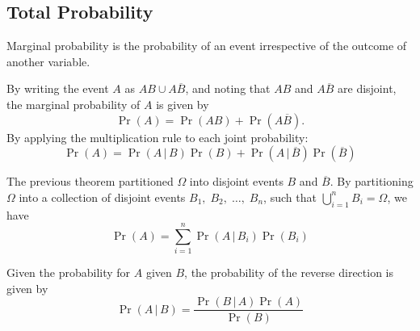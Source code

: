 \documentclass{article}
\begin{document}
\subsection{Total Probability}
\begin{definition}
    Marginal probability is the probability of an event \linebreak irrespective of the outcome of another variable.
\end{definition}
\begin{theorem}
    By writing the event \(A\) as \(AB \cup A\overline{B}\), and noting that \(AB\) and \(A\overline{B}\) are disjoint,
    the marginal probability of \(A\) is given by
    \begin{equation*}
        \Pr{\left( A \right)} = \Pr{\left( AB \right)} + \Pr{\left( A\overline{B} \right)}.
    \end{equation*}
    By applying the multiplication rule to each joint probability:
    \begin{equation*}
        \Pr{\left( A \right)} = \Pr{\left( A \,\vert\, B \right)}\Pr{\left( B \right)} + \Pr{\left( A \,\vert\, \overline{B} \right)}\Pr{\left( \overline{B} \right)}
    \end{equation*}
\end{theorem}
\begin{theorem}
    The previous theorem partitioned \(\Omega\) into disjoint events \(B\) and \(\overline{B}\).
    By partitioning \(\Omega\) into a collection of disjoint events
    \(B_1,\; B_2,\; \dots,\; B_n\), such that \(\bigcup_{i=1}^n B_i =
    \Omega\), we have
    \begin{equation*}
        \Pr{\left( A \right)} = \sum_{i = 1}^n \Pr{\left( A \,\vert\, B_i \right)}\Pr{\left( B_i \right)}
    \end{equation*}
\end{theorem}
\begin{theorem}
    Given the probability for \(A\) given \(B\), the probability of the reverse direction is given by
    \begin{equation*}
        \Pr{\left( A \,\vert\, B \right)} = \frac{\Pr{\left( B \,\vert\, A \right)}\Pr{\left( A \right)}}{\Pr{\left( B \right)}}
    \end{equation*}
\end{theorem}
\end{document}
